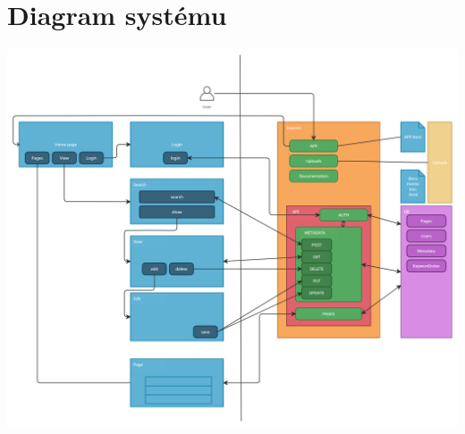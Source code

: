 \section{Diagram systému}
\noindent
\includegraphics[angle=-90,origin=c,width=\linewidth]{img/diagram.png}

